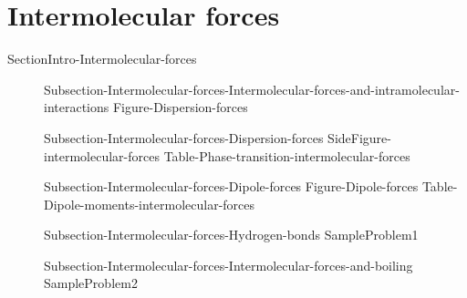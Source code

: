 \documentclass[main.tex]{subfiles}
\begin{document}
{\section{Intermolecular forces}{SectionIntro-Intermolecular-forces}
\sloppy \begin{description}
\item[] {Subsection-Intermolecular-forces-Intermolecular-forces-and-intramolecular-interactions}
{Figure-Dispersion-forces}
\item[] {Subsection-Intermolecular-forces-Dispersion-forces}
{SideFigure-intermolecular-forces}
{Table-Phase-transition-intermolecular-forces}
\item[] {Subsection-Intermolecular-forces-Dipole-forces}
{Figure-Dipole-forces}
{Table-Dipole-moments-intermolecular-forces}
\item[] {Subsection-Intermolecular-forces-Hydrogen-bonds}
{SampleProblem1}
\item[] {Subsection-Intermolecular-forces-Intermolecular-forces-and-boiling}
{SampleProblem2}
\end{description}




\renewcommand\chapterlabel{Ch-naming}

}{}
 
 








 

 \checkoddpage\ifoddpage \clearpage\thispagestyle{empty}\mbox{}\clearpage \else  \fi 
\end{document}
